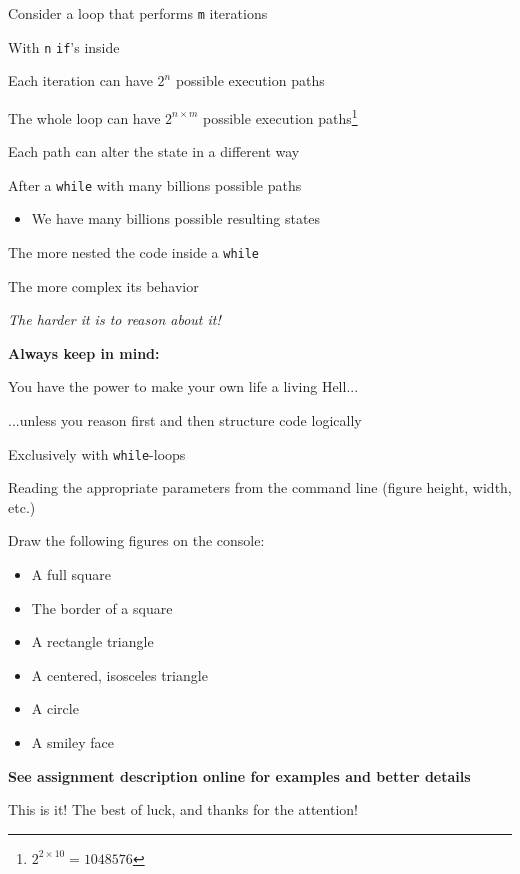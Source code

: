 \documentclass{beamer}
\begin{document}
\begin{slide}{
\item Consider a loop that performs \texttt{m} iterations
\item With \texttt{n} \texttt{if}'s inside
\item Each iteration can have $2^n$ possible execution paths
\item The whole loop can have $2^{n\times m}$ possible execution paths\footnote{$2^{2\times 10} = 1048576$}
}\end{slide}

\begin{slide}{
\item Each path can alter the state in a different way
\item After a \texttt{while} with many billions possible paths
\begin{itemize}
\item We have many billions possible resulting states
\end{itemize}
}\end{slide}

\begin{slide}{
\item The more nested the code inside a \texttt{while}
\item The more complex its behavior
\item \textit{The harder it is to reason about it!}
}\end{slide}

\begin{slide}{
\item \textbf{Always keep in mind:}
\item You have the power to make your own life a living Hell...
\pause
\item ...unless you reason first and then structure code logically
}\end{slide}

\begin{slide}{
\item Exclusively with \texttt{while}-loops
\item Reading the appropriate parameters from the command line (figure height, width, etc.)
\item Draw the following figures on the console:
\begin{itemize}
\item A full square 
\item The border of a square
\item A rectangle triangle
\item A centered, isosceles triangle
\item A circle
\item A smiley face
\end{itemize}
\item \textbf{See assignment description online for examples and better details}
}\end{slide}

\begin{frame}{This is it!}
\center
\fontsize{18pt}{7.2}\selectfont
The best of luck, and thanks for the attention!
\end{frame}
\end{document}
